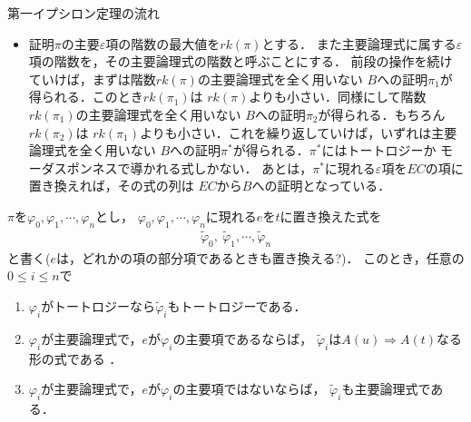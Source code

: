 \begin{itembox}[l]{第一イプシロン定理の流れ}
\begin{itemize}
			\item 証明$\pi$の主要$\varepsilon$項の階数の最大値を$rk(\pi)$とする．
				また主要論理式に属する$\varepsilon$項の階数を，その主要論理式の階数と呼ぶことにする．
				前段の操作を続けていけば，まずは階数$rk(\pi)$の主要論理式を全く用いない
				$B$への証明$\pi_{1}$が得られる．このとき$rk(\pi_{1})$は
				$rk(\pi)$よりも小さい．同様にして階数$rk(\pi_{1})$の主要論理式を全く用いない
				$B$への証明$\pi_{2}$が得られる．もちろん$rk(\pi_{2})$は
				$rk(\pi_{1})$よりも小さい．これを繰り返していけば，いずれは主要論理式を全く用いない
				$B$への証明$\pi^{\ast}$が得られる．$\pi^{\ast}$にはトートロジーか
				モーダスポンネスで導かれる式しかない．
				あとは，$\pi^{\ast}$に現れる$\varepsilon$項を$EC$の項に置き換えれば，その式の列は
				$EC$から$B$への証明となっている．
		\end{itemize}
	\end{itembox}
	
	$\pi$を$\varphi_{0},\varphi_{1},\cdots,\varphi_{n}$とし，
	$\varphi_{0},\varphi_{1},\cdots,\varphi_{n}$に現れる$e$を$t$に置き換えた式を
	\begin{align}
		\tilde{\varphi}_{0},\ \tilde{\varphi}_{1},\cdots, \tilde{\varphi}_{n}
	\end{align}
	と書く($e$は，どれかの項の部分項であるときも置き換える?)．
	このとき，任意の$0 \leq i \leq n$で
	\begin{enumerate}
		\item $\varphi_{i}$がトートロジーなら$\tilde{\varphi}_{i}$もトートロジーである．
		\item $\varphi_{i}$が主要論理式で，$e$が$\varphi_{i}$の主要項であるならば，
			$\tilde{\varphi}_{i}$は$A(u) \Longrightarrow A(t)$なる形の式である
			\footnotemark．
		\item $\varphi_{i}$が主要論理式で，$e$が$\varphi_{i}$の主要項ではないならば，
			$\tilde{\varphi}_{i}$も主要論理式である．
	\end{enumerate}
	
	

